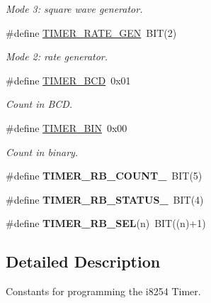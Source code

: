 \begin{DoxyCompactItemize}
\begin{DoxyCompactList}\small\item\em Mode 3\-: square wave generator. \end{DoxyCompactList}\item 
\hypertarget{group__i8254_ga5d4449e0fa1cf4a4d107a48a04a1265f}{\#define \hyperlink{group__i8254_ga5d4449e0fa1cf4a4d107a48a04a1265f}{T\-I\-M\-E\-R\-\_\-\-R\-A\-T\-E\-\_\-\-G\-E\-N}~B\-I\-T(2)}\label{group__i8254_ga5d4449e0fa1cf4a4d107a48a04a1265f}

\begin{DoxyCompactList}\small\item\em Mode 2\-: rate generator. \end{DoxyCompactList}\item 
\hypertarget{group__i8254_ga325b992a371d5d981c4eceff42fa5956}{\#define \hyperlink{group__i8254_ga325b992a371d5d981c4eceff42fa5956}{T\-I\-M\-E\-R\-\_\-\-B\-C\-D}~0x01}\label{group__i8254_ga325b992a371d5d981c4eceff42fa5956}

\begin{DoxyCompactList}\small\item\em Count in B\-C\-D. \end{DoxyCompactList}\item 
\hypertarget{group__i8254_gad2913dcf2f91453317bd035589ac0a7d}{\#define \hyperlink{group__i8254_gad2913dcf2f91453317bd035589ac0a7d}{T\-I\-M\-E\-R\-\_\-\-B\-I\-N}~0x00}\label{group__i8254_gad2913dcf2f91453317bd035589ac0a7d}

\begin{DoxyCompactList}\small\item\em Count in binary. \end{DoxyCompactList}\item 
\hypertarget{group__i8254_ga6c248216df24b5e9d907d126d80bd195}{\#define {\bfseries T\-I\-M\-E\-R\-\_\-\-R\-B\-\_\-\-C\-O\-U\-N\-T\-\_\-}~B\-I\-T(5)}\label{group__i8254_ga6c248216df24b5e9d907d126d80bd195}

\item 
\hypertarget{group__i8254_ga08b4952bb7058684a3f8f66be04dd45e}{\#define {\bfseries T\-I\-M\-E\-R\-\_\-\-R\-B\-\_\-\-S\-T\-A\-T\-U\-S\-\_\-}~B\-I\-T(4)}\label{group__i8254_ga08b4952bb7058684a3f8f66be04dd45e}

\item 
\hypertarget{group__i8254_gaf598b17740e07842a0545af512714711}{\#define {\bfseries T\-I\-M\-E\-R\-\_\-\-R\-B\-\_\-\-S\-E\-L}(n)~B\-I\-T((n)+1)}\label{group__i8254_gaf598b17740e07842a0545af512714711}

\end{DoxyCompactItemize}


\subsection{Detailed Description}
Constants for programming the i8254 Timer. 